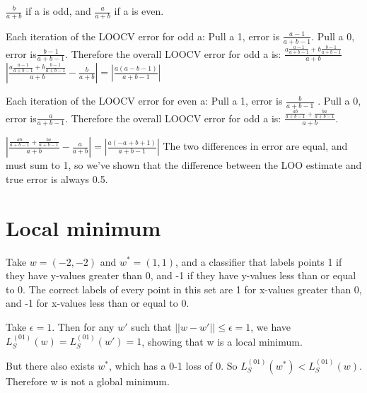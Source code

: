 \documentclass{article}
\begin{document}
\(\frac{b}{a+b} \) if a is odd, and \(\frac{a}{a+b} \) if a is even.

Each iteration of the LOOCV error for odd a:
Pull a 1, error is \( \frac{a-1}{a+b-1} \).
Pull a 0, error is\( \frac{b-1}{a+b-1} \).
Therefore the overall LOOCV error for odd a is: \( \frac {a \frac{a-1}{a+b-1} + b \frac{b-1}{a+b-1}} {a+b} \)
\( |\frac {a \frac{a-1}{a+b-1} + b \frac{b-1}{a+b-1}} {a+b} - \frac{b}{a+b} | = |\frac {a(a-b-1)}{a+b-1} |\)

Each iteration of the LOOCV error for even a:
Pull a 1, error is \( \frac{b}{a+b-1} \) .
Pull a 0, error is\( \frac{a}{a+b-1} \).
Therefore the overall LOOCV error for odd a is: \( \frac {\frac{ab}{a+b-1} + \frac{ba}{a+b-1}} {a+b} \).

\( |\frac {\frac{ab}{a+b-1} + \frac{ba}{a+b-1}} {a+b} - \frac{a}{a+b} | = |\frac {a(-a+b+1)}{a+b-1} |\)
The two differences in error are equal, and must sum to 1, so we've shown that the difference between the LOO estimate and true error is always 0.5.

\section{Local minimum}
Take  \(w= (-2, -2)\) and \(w^* = (1,1) \), and a classifier that labels points 1 if they have y-values greater than 0, and -1 if they have y-values less than or equal to 0.
The correct labels of every point in this set are 1 for x-values greater than 0, and -1 for x-values less than or equal to 0.

Take \(\epsilon = 1\). Then for any \(w'\) such that \(||w-w'|| \le \epsilon = 1 \), we have \(L_S^{(01)}(w) = L_S^{(01)}(w') = 1 \), showing that w is a local minimum.

But there also exists \(w^*\), which has a 0-1 loss of 0. So \(L_S^{(01)}(w^*)<L_S^{(01)}(w)\). Therefore w is not a global minimum.
\end{document}
